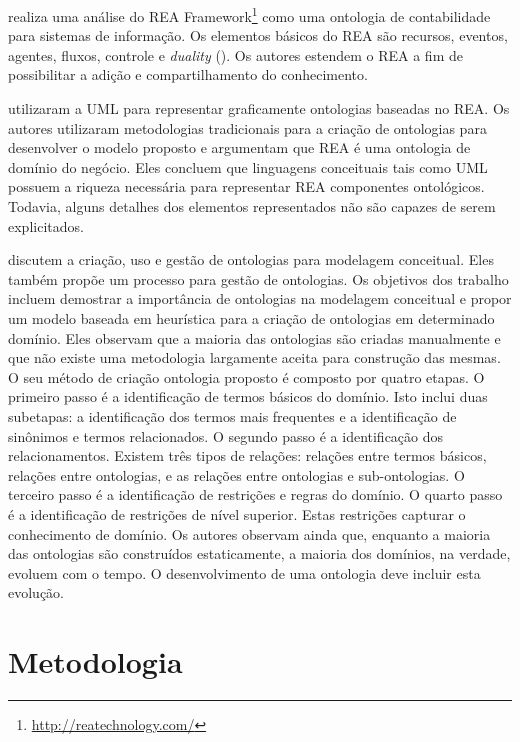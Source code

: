 \documentclass[msc,proposal,hidelot,hideabstract]{ppgccufmg} %
\begin{document}
\cite{lupacsc2010role} realiza uma análise do REA Framework\footnote{\url{http://reatechnology.com/}} como uma ontologia de contabilidade para sistemas de informação. Os elementos básicos do REA são recursos, eventos, agentes, fluxos, controle e \textit{duality} (\cite{mccarthy1982rea}). Os autores estendem o REA a fim de possibilitar a adição e compartilhamento do conhecimento.

\cite{gailly2007positioning} utilizaram a UML para representar graficamente ontologias baseadas no REA. Os autores utilizaram metodologias tradicionais para a criação de ontologias para desenvolver o modelo proposto e argumentam que REA é uma ontologia de domínio do negócio. Eles concluem que linguagens conceituais tais como UML possuem a riqueza necessária para representar REA componentes ontológicos. Todavia, alguns detalhes dos elementos representados não são capazes de serem explicitados.

\cite{sugumaran2002ontologies} discutem a criação, uso e gestão de ontologias para modelagem conceitual. Eles também propõe um processo para gestão de ontologias. Os objetivos dos trabalho incluem demostrar a importância de ontologias na modelagem conceitual e propor um modelo baseada em heurística  para a criação de ontologias em determinado domínio. Eles observam que a maioria das ontologias são criadas manualmente e que não existe uma metodologia largamente aceita para construção das mesmas. O seu método de criação ontologia proposto é composto por quatro etapas. O primeiro passo é a identificação de termos básicos do domínio. Isto inclui duas subetapas: a identificação dos termos mais frequentes e a identificação de sinônimos e termos relacionados. O segundo passo é a identificação dos relacionamentos. Existem três tipos de relações: relações entre termos básicos, relações entre ontologias, e as relações entre ontologias e sub-ontologias. O terceiro passo é a identificação de restrições e regras do domínio. O quarto passo é a identificação de restrições de nível superior. Estas restrições capturar o conhecimento de domínio. Os autores observam ainda que, enquanto a maioria das ontologias são construídos estaticamente, a maioria dos domínios, na verdade, evoluem com o tempo. O desenvolvimento de uma ontologia deve incluir esta evolução.

\chapter{Metodologia}
\label{ch:metodologia}
\end{document}

